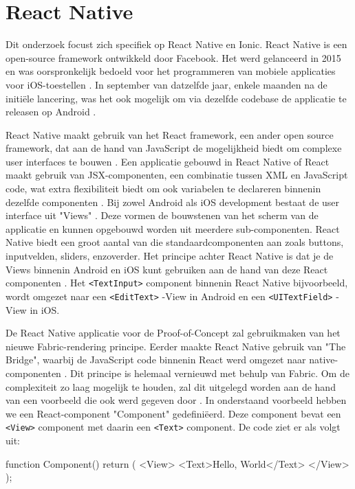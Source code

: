 \section{React Native}
\label{sec:react-native}

Dit onderzoek focust zich specifiek op React Native en Ionic. React Native is een open-source framework ontwikkeld door Facebook. Het werd gelanceerd in 2015 en was oorspronkelijk bedoeld voor het programmeren van mobiele applicaties voor iOS-toestellen \autocite{Bron2, Bron1}. In september van datzelfde jaar, enkele maanden na de initiële lancering, was het ook mogelijk om via dezelfde codebase de applicatie te releasen op Android \autocite{Bron1}.

React Native maakt gebruik van het React framework, een ander open source framework, dat aan de hand van JavaScript de mogelijkheid biedt om complexe user interfaces te bouwen \autocite{Bron17}. Een applicatie gebouwd in React Native of React maakt gebruik van JSX-componenten, een combinatie tussen XML en JavaScript code, wat extra flexibiliteit biedt om ook variabelen te declareren binnenin dezelfde componenten \autocite{Bron2}. Bij zowel Android als iOS development bestaat de user interface uit "Views" \autocite{Bron18}. Deze vormen de bouwstenen van het scherm van de applicatie en kunnen opgebouwd worden uit meerdere sub-componenten. React Native biedt een groot aantal van die standaardcomponenten aan zoals buttons, inputvelden, sliders, enzoverder. Het principe achter React Native is dat je de Views binnenin Android en iOS kunt gebruiken aan de hand van deze React componenten \autocite{Bron18}. Het \verb|<TextInput>| component binnenin React Native bijvoorbeeld, wordt omgezet naar een \verb|<EditText>| -View in Android en een \verb|<UITextField>| -View in iOS.

De React Native applicatie voor de Proof-of-Concept zal gebruikmaken van het nieuwe Fabric-rendering principe. Eerder maakte React Native gebruik van "The Bridge", waarbij de JavaScript code binnenin React werd omgezet naar native-componenten \autocite{Bron1}. Dit principe is helemaal vernieuwd met behulp van Fabric. Om de complexiteit zo laag mogelijk te houden, zal dit uitgelegd worden aan de hand van een voorbeeld die ook werd gegeven door \autocite{Bron17}. In onderstaand voorbeeld hebben we een React-component "Component" gedefiniëerd. Deze component bevat een \verb|<View>| component met daarin een \verb|<Text>| component. De code ziet er als volgt uit:

\begin{LVerbatim}
function Component() {
  return (
    <View>
      <Text>Hello, World</Text>
    </View>
  );
}
\end{LVerbatim}

